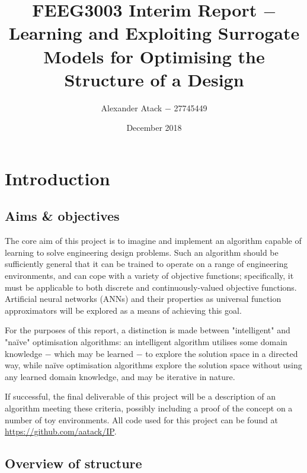 \documentclass[a4paper]{article}
\begin{document}
\title{FEEG3003 Interim Report $-$ Learning and Exploiting Surrogate Models for Optimising the Structure of a Design}
\author{Alexander Atack $-$ 27745449}
\date{December 2018}
\maketitle

\section{Introduction}

\subsection{Aims \& objectives}

The core aim of this project is to imagine and implement an algorithm capable of learning to solve engineering design problems.
Such an algorithm should be sufficiently general that it can be trained to operate on a range of engineering environments,
and can cope with a variety of objective functions; specifically, it must be applicable to both discrete and continuously-valued objective functions.
Artificial neural networks (ANNs) and their properties as universal function approximators will be explored as a means of achieving this goal.

For the purposes of this report, a distinction is made between "intelligent" and "na\"ive" optimisation algorithms:
an intelligent algorithm utilises some domain knowledge $-$ which may be learned $-$ to explore the solution space in a directed way,
while na\"ive optimisation algorithms explore the solution space without using any learned domain knowledge, and may be iterative in nature.

If successful, the final deliverable of this project will be a description of an algorithm meeting these criteria,
possibly including a proof of the concept on a number of toy environments.
All code used for this project can be found at \url{https://github.com/aatack/IP}.

\subsection{Overview of structure}
\end{document}
